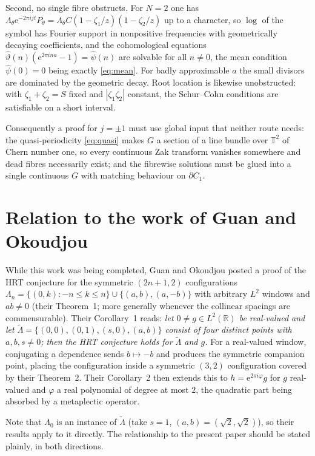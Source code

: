 \documentclass[11pt]{amsart}
\theoremstyle{remark}
\newcommand{\R}{\mathbb R}
\newcommand{\T}{\mathbb T}
\newcommand{\e}{\mathrm e}
\begin{document}
Second, no single fibre obstructs. For $N=2$ one has
$\Lambda_\theta\e^{-2\pi ijt}P_\theta=\Lambda_\theta C(1-\zeta_1/z)(1-\zeta_2/z)$ up to a
character, so $\log$ of the symbol has Fourier support in nonpositive frequencies with
geometrically decaying coefficients, and the cohomological equations
$\hat\vartheta(n)(\e^{2\pi ina}-1)=\hat\psi(n)$ are solvable for all $n\neq0$, the mean
condition $\hat\psi(0)=0$ being exactly \eqref{eq:mean}. For badly approximable $a$ the small
divisors are dominated by the geometric decay. Root location is likewise unobstructed: with
$\zeta_1+\zeta_2=S$ fixed and $|\zeta_1\zeta_2|$ constant, the Schur--Cohn conditions are
satisfiable on a short interval.

Consequently a proof for $j=\pm1$ must use global input that neither route needs: the
quasi-periodicity \eqref{eq:quasi} makes $G$ a section of a line bundle over $\T^2$ of Chern
number one, so every continuous Zak transform vanishes somewhere and dead fibres necessarily
exist; and the fibrewise solutions must be glued into a single continuous $G$ with matching
behaviour on $\partial C_1$.

\section{Relation to the work of Guan and Okoudjou}\label{sec:GO}

While this work was being completed, Guan and Okoudjou \cite{GO} posted a proof of the HRT
conjecture for the symmetric $(2n+1,2)$ configurations
$\Lambda_n=\{(0,k):-n\leq k\leq n\}\cup\{(a,b),(a,-b)\}$ with arbitrary $L^2$ windows and
$ab\neq0$ (their Theorem~1; more generally whenever the collinear spacings are
commensurable). Their Corollary~1 reads: \emph{let $0\neq g\in L^2(\R)$ be real-valued and
let $\widetilde\Lambda=\{(0,0),(0,1),(s,0),(a,b)\}$ consist of four distinct points with
$a,b,s\neq0$; then the HRT conjecture holds for $\widetilde\Lambda$ and $g$.} For a
real-valued window, conjugating a dependence sends $b\mapsto-b$ and produces the symmetric
companion point, placing the configuration inside a symmetric $(3,2)$ configuration covered
by their Theorem~2. Their Corollary~2 then extends this to $h=\e^{2\pi i\varphi}g$ for $g$
real-valued and $\varphi$ a real polynomial of degree at most $2$, the quadratic part being
absorbed by a metaplectic operator.

Note that $\Lambda_0$ is an instance of $\widetilde\Lambda$ (take $s=1$,
$(a,b)=(\sqrt2,\sqrt2)$), so their results apply to it directly. The relationship to the
present paper should be stated plainly, in both directions.
\end{document}

